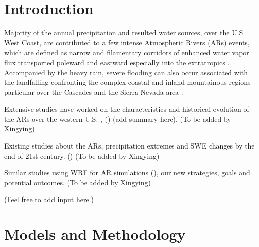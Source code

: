 \documentclass[draft,ms]{agutex}   %
\begin{document}
\begin{article}

%
\section{Introduction}

Majority of the annual precipitation and resulted water sources, over the U.S. West Coast, are contributed to a few intense Atmospheric Rivers (ARs) events, which are defined as narrow and filamentary corridors of enhanced water vapor flux transported poleward and eastward especially into the extratropics \citep{zhu1998proposed, ralph2004satellite}. Accompanied by the heavy rain, severe flooding can also occur associated with the landfalling confronting the complex coastal and inland mountainous regions particular over the Cascades and the Sierra Nevada area \citep{ralph2006flooding, neiman2011flooding}.

Extensive studies have worked on the characteristics and historical evolution of the ARs over the western U.S. \citep{rutz2014climatological, dettinger2011atmospheric}, (\citep{rutz2014climatological, dettinger2013atmospheric, jackson2016evaluation}) (add summary here).  {\color{red}(To be added by Xingying)}

Existing studies about the ARs, precipitation extremes and SWE changes by the end of 21st century. (\citep{gao2015dynamical, dominguez2012changes, warner2015changes, guan2010extreme}) {\color{red}(To be added by Xingying)}

Similar studies using WRF for AR simulations (\citep{leung2009atmospheric}), our new strategies, goals and potential outcomes.  {\color{red}(To be added by Xingying)}

({\color{red}Feel free to add input here.})



\section{Models and Methodology}


\end{article}
\end{document}

